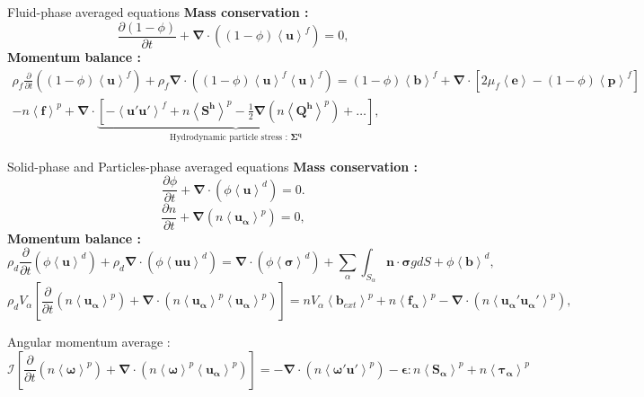 \documentclass[aspectratio=169]{beamer}
\begin{document}
\begin{frame}
  {Fluid-phase averaged equations}
  \textbf{Mass conservation :}
  \begin{equation}
    \label{eq:Cmassaf}
    \frac{\partial(1 - \phi)}{\partial t}+\bm{\nabla}\cdot((1-\phi) \left<\bm{u}\right>^f) = 0,
  \end{equation}
  \textbf{Momentum balance :}
  \begin{multline}
    \rho_f\frac{\partial}{\partial t} ((1-\phi)\left<\bm{u}\right>^f) 
    + \rho_f\bm{\nabla}\cdot\left((1-\phi) \left<\bm{u}\right>^f\left<\bm{u}\right>^f\right)
    = (1-\phi)\left<\bm{b}\right>^f 
    +\bm{\nabla}\cdot\left[2 \mu_f\left<\bm{e}\right> -(1-\phi) \left<\bm{p}\right>^f\right]
    \\-n\left<\bm{f}\right>^p
    +\bm{\nabla}\cdot\underbrace{\left[ - \left<\bm{u'u'}\right>^f +n\left<\bm{S^h}\right>^p -\frac{1}{2}\bm{\nabla}(n\left<\bm{Q^h}\right>^p) + \ldots\right]}_{\text{Hydrodynamic particle stress : } \bm{\Sigma^q}},
    \label{eq:favgsp}
\end{multline}
\end{frame}
\begin{frame}
  {Solid-phase and Particles-phase averaged equations}
  \textbf{Mass conservation :}
  \begin{equation}
    \label{eq:Cmassad}
    \frac{\partial \phi}{\partial t}+\bm{\nabla}\cdot(\phi \left<\bm{u}\right>^d) = 0.
\end{equation}
\begin{equation}
  \label{eq:pavgMASS}
  \frac{\partial n}{\partial t} + \bm{\nabla}\left(n\left<\bm{u_\alpha}\right>^p\right) = 0,
\end{equation} 
\textbf{Momentum balance :}
  \begin{equation*}
    \label{eq:davg}
    \rho_d\frac{\partial}{\partial t} (\phi \left<\bm{u}\right>^d) 
    + \rho_d\bm{\nabla}\cdot(\phi \left<\bm{uu}\right>^d)
    = \bm{\nabla}\cdot(\phi \left<\bm{\sigma}\right>^d)
    +\sum_\alpha\int_{S_\alpha}\bm{n}\cdot\bm{\sigma} g dS 
    +\phi\left<\bm{b}\right>^d,
\end{equation*}
\begin{equation}
  \label{eq:pavgsp}
  \rho_d V_\alpha \left[\frac{\partial }{\partial t}(n\left<\bm{u_\alpha}\right>^p) 
  + \bm{\nabla}\cdot(n\left<\bm{u_\alpha}\right>^p\left<\bm{u_\alpha}\right>^p)\right] 
  = n V_\alpha \left<\bm{b}_{ext}\right>^p 
  + n\left<\bm{f_\alpha}\right>^p 
  - \bm{\nabla}\cdot(n\left<\bm{u_\alpha'u_\alpha'}\right>^p),
\end{equation}
\end{frame}
\begin{frame}
  {Angular momentum average :}
  \begin{equation}
    \bm{\mathcal{I}} \left[\frac{\partial}{\partial t}(n\left<\bm{\omega}\right>^p)+\bm{\nabla}\cdot(n\left<\bm{\omega }\right>^p\left<\bm{u_\alpha}\right>^p)\right] = -\bm{\nabla}\cdot(n\left<\bm{\omega'u'}\right>^p) - \bm{\epsilon} : n\left<\bm{S_\alpha}\right>^p + n\left<\bm{\tau_\alpha}\right>^p
    \label{eq:Iavg}
\end{equation}
\end{frame}
\end{document}
